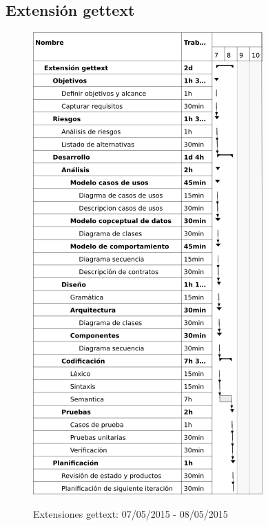 \subsection{Extensión gettext}
\begin{center}
\begin{figure}[H]
\centering
\includegraphics[scale=1]{planning/26-extension-gettext.png} \\
\caption{Extensiones gettext: 07/05/2015 - 08/05/2015 }
\end{figure}
\end{center}


